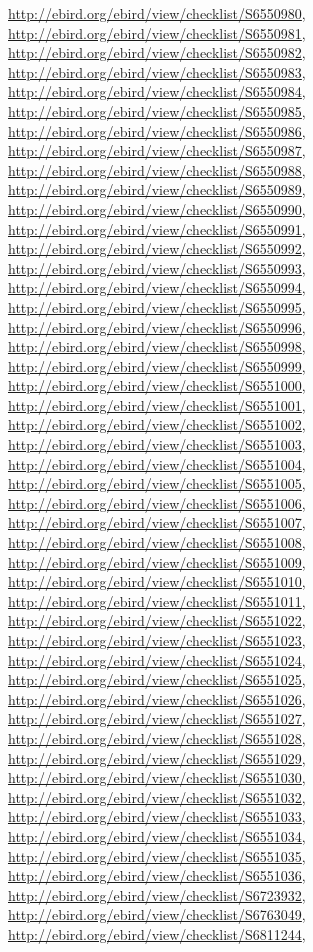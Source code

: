 \documentclass[9pt, article]{memoir}
\begin{document}
\begin{multicols}{2}
\url{http://ebird.org/ebird/view/checklist/S6550980}, 
\url{http://ebird.org/ebird/view/checklist/S6550981}, 
\url{http://ebird.org/ebird/view/checklist/S6550982}, 
\url{http://ebird.org/ebird/view/checklist/S6550983}, 
\url{http://ebird.org/ebird/view/checklist/S6550984}, 
\url{http://ebird.org/ebird/view/checklist/S6550985}, 
\url{http://ebird.org/ebird/view/checklist/S6550986}, 
\url{http://ebird.org/ebird/view/checklist/S6550987}, 
\url{http://ebird.org/ebird/view/checklist/S6550988}, 
\url{http://ebird.org/ebird/view/checklist/S6550989}, 
\url{http://ebird.org/ebird/view/checklist/S6550990}, 
\url{http://ebird.org/ebird/view/checklist/S6550991}, 
\url{http://ebird.org/ebird/view/checklist/S6550992}, 
\url{http://ebird.org/ebird/view/checklist/S6550993}, 
\url{http://ebird.org/ebird/view/checklist/S6550994}, 
\url{http://ebird.org/ebird/view/checklist/S6550995}, 
\url{http://ebird.org/ebird/view/checklist/S6550996}, 
\url{http://ebird.org/ebird/view/checklist/S6550998}, 
\url{http://ebird.org/ebird/view/checklist/S6550999}, 
\url{http://ebird.org/ebird/view/checklist/S6551000}, 
\url{http://ebird.org/ebird/view/checklist/S6551001}, 
\url{http://ebird.org/ebird/view/checklist/S6551002}, 
\url{http://ebird.org/ebird/view/checklist/S6551003}, 
\url{http://ebird.org/ebird/view/checklist/S6551004}, 
\url{http://ebird.org/ebird/view/checklist/S6551005}, 
\url{http://ebird.org/ebird/view/checklist/S6551006}, 
\url{http://ebird.org/ebird/view/checklist/S6551007}, 
\url{http://ebird.org/ebird/view/checklist/S6551008}, 
\url{http://ebird.org/ebird/view/checklist/S6551009}, 
\url{http://ebird.org/ebird/view/checklist/S6551010}, 
\url{http://ebird.org/ebird/view/checklist/S6551011}, 
\url{http://ebird.org/ebird/view/checklist/S6551022}, 
\url{http://ebird.org/ebird/view/checklist/S6551023}, 
\url{http://ebird.org/ebird/view/checklist/S6551024}, 
\url{http://ebird.org/ebird/view/checklist/S6551025}, 
\url{http://ebird.org/ebird/view/checklist/S6551026}, 
\url{http://ebird.org/ebird/view/checklist/S6551027}, 
\url{http://ebird.org/ebird/view/checklist/S6551028}, 
\url{http://ebird.org/ebird/view/checklist/S6551029}, 
\url{http://ebird.org/ebird/view/checklist/S6551030}, 
\url{http://ebird.org/ebird/view/checklist/S6551032}, 
\url{http://ebird.org/ebird/view/checklist/S6551033}, 
\url{http://ebird.org/ebird/view/checklist/S6551034}, 
\url{http://ebird.org/ebird/view/checklist/S6551035}, 
\url{http://ebird.org/ebird/view/checklist/S6551036}, 
\url{http://ebird.org/ebird/view/checklist/S6723932}, 
\url{http://ebird.org/ebird/view/checklist/S6763049}, 
\url{http://ebird.org/ebird/view/checklist/S6811244}, 

\end{multicols}
\end{document}
